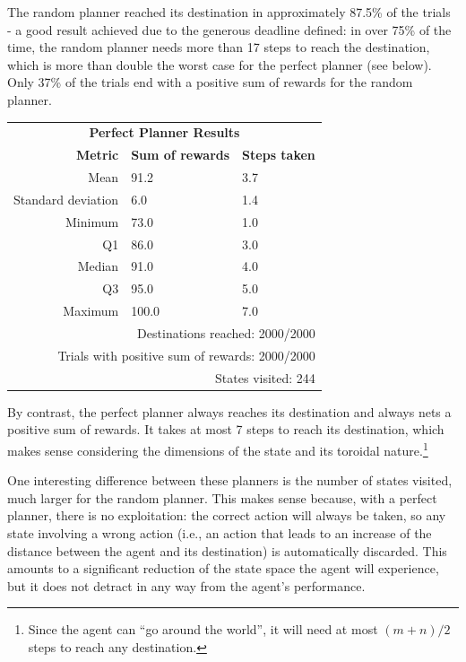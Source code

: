 \documentclass{article}
\begin{document}
The random planner reached its destination in approximately 87.5\% of the trials - a good result achieved due to the generous deadline defined: in over 75\% of the time, the random planner needs more than 17 steps to reach the destination, which is more than double the worst case for the perfect planner (see below). Only 37\% of the trials end with a positive sum of rewards for the random planner.  

\begin{center}
   \begin{tabular}{rll}
        \multicolumn{3}{c}{\textbf{Perfect Planner Results}} \\
        \textbf{Metric}     & \textbf{Sum of rewards}   & \textbf{Steps taken}\\
        Mean                & 91.2                      & 3.7\\
        Standard deviation  & 6.0                       & 1.4\\
        Minimum             & 73.0                      & 1.0\\
        Q1                  & 86.0                      & 3.0\\
        Median              & 91.0                      & 4.0\\
        Q3                  & 95.0                      & 5.0\\
        Maximum             & 100.0                     & 7.0\\
        \multicolumn{3}{r}{Destinations reached: 2000/2000}\\
        \multicolumn{3}{r}{Trials with positive sum of rewards: 2000/2000}\\
        \multicolumn{3}{r}{States visited: 244}\\
    \end{tabular}
\end{center}

By contrast, the perfect planner always reaches its destination and always nets a positive sum of rewards. It takes at most 7 steps to reach its destination, which makes sense considering the dimensions of the state and its toroidal nature.\footnote{Since the agent can ``go around the world'', it will need at most $(m+n)/2$ steps to reach any destination.}

One interesting difference between these planners is the number of states visited, much larger for the random planner. This makes sense because, with a perfect planner, there is no exploitation: the correct action will always be taken, so any state involving a wrong action (i.e., an action that leads to an increase of the distance between the agent and its destination) is automatically discarded. This amounts to a significant reduction of the state space the agent will experience, but it does not detract in any way from the agent's performance. 
\end{document}

